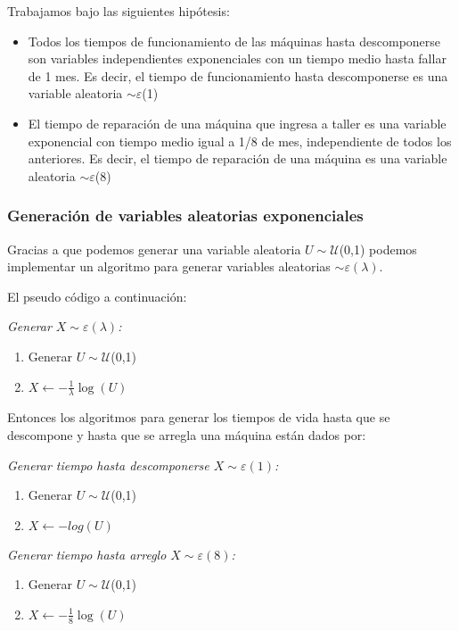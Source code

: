 \documentclass[12pt]{article}
\begin{document}
Trabajamos bajo las siguientes hipótesis:
\begin{itemize}
 \item Todos los tiempos de funcionamiento de las máquinas hasta descomponerse son variables independientes
 exponenciales con un tiempo medio hasta fallar de 1 mes. Es decir, el tiempo de funcionamiento hasta
 descomponerse es una variable aleatoria $\sim\varepsilon$(1)
 \item El tiempo de reparación de una máquina que ingresa a taller es una variable exponencial con tiempo medio igual a 1/8 de mes,
 independiente de todos los anteriores. Es decir, el tiempo de reparación de una máquina es una variable aleatoria $\sim\varepsilon$(8)
\end{itemize}
\vspace{0.2in}
\pagebreak

\subsubsection{Generación de variables aleatorias exponenciales}

Gracias a que podemos generar una variable aleatoria $U\sim \mathcal{U}$(0,1)
podemos implementar un algoritmo para generar variables aleatorias $\sim\varepsilon(\lambda)$.

El pseudo código a continuación:

\vspace{0.14in}
\emph{Generar $X \sim\varepsilon(\lambda)$:}
  \begin{enumerate}
   \item Generar $U\sim \mathcal{U}$(0,1)
   \item $X\leftarrow -\frac{1}{\lambda}\log(U)$
  \end{enumerate}

Entonces los algoritmos para generar los tiempos de vida hasta que se descompone y hasta que se arregla una
máquina están dados por:
\vspace{0.14in}

\emph{Generar tiempo hasta descomponerse $X \sim\varepsilon(1)$:}
  \begin{enumerate}
   \item Generar $U\sim \mathcal{U}$(0,1)
   \item $X\leftarrow -log(U)$
  \end{enumerate}
\vspace{0.14in}

\emph{Generar tiempo hasta arreglo $X \sim\varepsilon(8)$:}
  \begin{enumerate}
   \item Generar $U\sim \mathcal{U}$(0,1)
   \item\indent$X\leftarrow -\frac{1}{8}\log(U)$
  \end{enumerate}
\pagebreak
\end{document}
